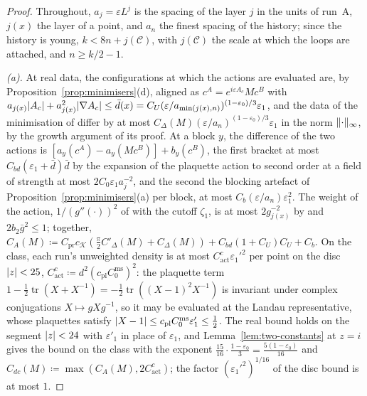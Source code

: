 \documentclass[11pt]{preprint}
\DeclarePairedDelimiter{\abs}{\lvert}{\rvert}
\DeclarePairedDelimiter{\norm}{\lVert}{\rVert}
\numberwithin{equation}{section}
\theoremstyle{definition}
\theoremstyle{remark}
\theoremstyle{plain}
\begin{document}
\begin{proof}
Throughout, $a_j = \varepsilon L^j$ is the spacing of the layer $j$ in the units of run~A, $j(x)$ the layer of a point, and $a_n$ the finest spacing of the history; since the history is young, $k < 8n + j(\mathcal C)$, with $j(\mathcal C)$ the scale at which the loops are attached, and $n \geq k/2 - 1$.

\emph{(a).} At real data, the configurations at which the actions are evaluated are, by Proposition~\ref{prop:minimisers}(d), aligned as $c^A = e^{i\varepsilon A_c}Mc^B$ with $a_{j(x)}\abs{A_c} + a_{j(x)}^2\abs{\nabla A_c} \leq \bar d(x) = C_U(\varepsilon/a_{\min(j(x),n)})^{(1-\varepsilon_0)/3}\varepsilon_1$, and the data of the minimisation of \cite[(1.3)]{BalabanLFR2} differ by at most $C_\Delta(M)(\varepsilon/a_n)^{(1-\varepsilon_0)/3}\varepsilon_1$ in the norm $\norm\cdot_\infty$, by the growth argument of its proof. At a block $y$, the difference of the two actions is $[a_y(c^A) - a_y(Mc^B)] + b_y(c^B)$, the first bracket at most $C_{bd}(\varepsilon_1 + \bar d)\bar d$ by the expansion of the plaquette action to second order at a field of strength at most $2C_0\varepsilon_1a_j^{-2}$, and the second the blocking artefact of Proposition~\ref{prop:minimisers}(a) per block, at most $C_b(\varepsilon/a_n)\varepsilon_1^2$. The weight of the action, $1/(g''(\cdot))^2$ of \cite[(1.70)]{BalabanLFR2} with the cutoff $\zeta_1$, is at most $2g_{j(x)}^{-2}$ by \cite[(2.24), p.~259]{BalabanCRE} and $2b_2\bar g^2 \leq 1$; together, $C_A(M) \coloneqq C_{\mathrm{pr}}c_{\mathcal K}(\frac{\pi}{2}C'_\Delta(M) + C_\Delta(M)) + C_{bd}(1 + C_U)C_U + C_b$. On the class, each run's unweighted density is at most $C^c_{\mathrm{act}}\varepsilon_1'^2$ per point on the disc $\abs z < 25$, $C^c_{\mathrm{act}} \coloneqq d^2(c_{\mathrm{pl}}C^{\mathrm{ms}}_0)^2$: the plaquette term $1 - \frac12\operatorname{tr}(X + X^{-1}) = -\frac12\operatorname{tr}((X - 1)^2X^{-1})$ is invariant under complex conjugations $X \mapsto gXg^{-1}$, so it may be evaluated at the Landau representative, whose plaquettes satisfy $\abs{X - 1} \leq c_{\mathrm{pl}}C^{\mathrm{ms}}_0\varepsilon'_1 \leq \frac12$. The real bound holds on the segment $\abs z < 24$ with $\varepsilon'_1$ in place of $\varepsilon_1$, and Lemma~\ref{lem:two-constants} at $z = i$ gives the bound on the class with the exponent $\frac{15}{16}\cdot\frac{1-\varepsilon_0}{3} = \frac{5(1-\varepsilon_0)}{16}$ and $C_{dc}(M) \coloneqq \max(C_A(M), 2C^c_{\mathrm{act}})$; the factor $(\varepsilon_1'^2)^{1/16}$ of the disc bound is at most $1$.


\end{proof}
\end{document}
